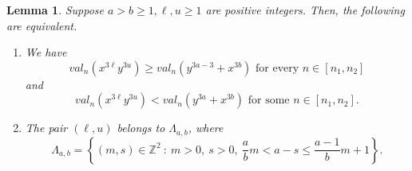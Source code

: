 \documentclass{article}
\newcommand{\ZZ}{\mathbb{Z}}
\newtheorem{lemma}{Lemma}
\begin{document}
\begin{lemma}\label{lemma:BadTerms}
    Suppose $a>b\geq 1, \ell,u\geq1$ are positive integers. Then, the following are equivalent.
    \begin{enumerate}
        \item We have
        \[
        val_n(x^{3\ell}y^{3u}) \geq val_n(y^{3a-3}+ x^{3b}) \textrm{ for every } n\in\left[n_1,n_2\right]
        \]
        and
        \[
         val_n(x^{3\ell}y^{3u}) < val_n(y^{3a} + x^{3b}) \textrm{ for some } n\in\left[n_1,n_2\right].
         \]
         \item The pair $(\ell,u)$ belongs to $\Lambda_{a,b}$, where
         \[
         \Lambda_{a,b}=\left\{(m,s)\in\ZZ^2 \ : \ m>0,\ s>0, \   \frac{a}{b}m <a-s\leq \frac{a-1}{b}m+1\right\}.
         \]
    \end{enumerate}
\end{lemma}
\end{document}
